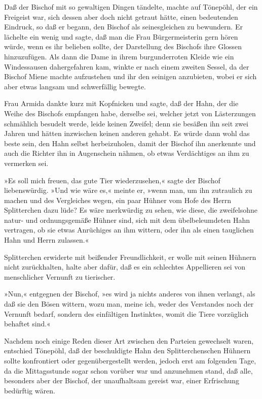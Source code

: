 Daß der Bischof mit so gewaltigen Dingen tändelte, machte auf
Tönepöhl, der ein Freigeist war, sich dessen aber doch nicht
getraut hätte, einen bedeutenden Eindruck, so daß\pagenum{[40]} er
begann, den Bischof als seinesgleichen zu bewundern. Er lächelte
ein wenig und sagte, daß man die Frau Bürgermeisterin gern hören
würde, wenn es ihr belieben sollte, der Darstellung des Bischofs
ihre Glossen hinzuzufügen. Als dann die Dame in ihrem
burgunderroten Kleide wie ein Windessausen dahergefahren kam,
winkte er nach einem zweiten Sessel, da der Bischof Miene machte
aufzustehen und ihr den seinigen anzubieten, wobei er sich aber
etwas langsam und schwerfällig bewegte.

Frau Armida dankte kurz mit Kopfnicken und sagte, daß der Hahn, der
die Weihe des Bischofs empfangen habe, derselbe sei, welcher jetzt
von Lästerzungen schmählich besudelt werde, leide keinen Zweifel;
denn sie besäßen ihn seit zwei Jahren und hätten inzwischen keinen
anderen gehabt. Es würde dann wohl das beste sein, den Hahn selbst
herbeizuholen, damit der Bischof ihn anerkennte und auch die
Richter ihn in Augenschein nähmen, ob etwas Verdächtiges an ihm zu
vermerken sei.

»Es soll mich freuen, das gute Tier wiederzusehen,« sagte der
Bischof liebenswürdig. »Und wie wäre es,« meinte er, »wenn man, um
ihn zutraulich zu machen und des Vergleiches wegen, ein paar Hühner
vom Hofe des Herrn Splitterchen dazu lüde? Es wäre merkwürdig zu
sehen, wie diese, die zweifelsohne natur- und ordnungsgemäße Hühner
sind, sich mit dem übelbeleumdeten Hahn vertragen, ob sie etwas
Anrüchiges an ihm wittern, oder ihn als einen tauglichen Hahn und
Herrn zulassen.«

Splitterchen erwiderte mit beißender Freundlichkeit, er wolle mit
seinen Hühnern nicht zurückhalten, halte aber dafür, daß es ein
schlechtes Appellieren sei von menschlicher Vernunft zu
tierischer.

\pagenum{[41]}»Nun,« entgegnen der Bischof, »es wird ja nichts
anderes von ihnen verlangt, als daß sie den Bösen wittern, wozu
man, meine ich, weder des Verstandes noch der Vernunft bedarf,
sondern des einfältigen Instinktes, womit die Tiere vorzüglich
behaftet sind.«

Nachdem noch einige Reden dieser Art zwischen den Parteien
gewechselt waren, entschied Tönepöhl, daß der beschuldigte Hahn den
Splitterchenschen Hühnern sollte konfrontiert oder
gegenübergestellt werden, jedoch erst am folgenden Tage, da die
Mittagsstunde sogar schon vorüber war und anzunehmen stand, daß
alle, besonders aber der Bischof, der unaufhaltsam gereist war,
einer Erfrischung bedürftig wären.

